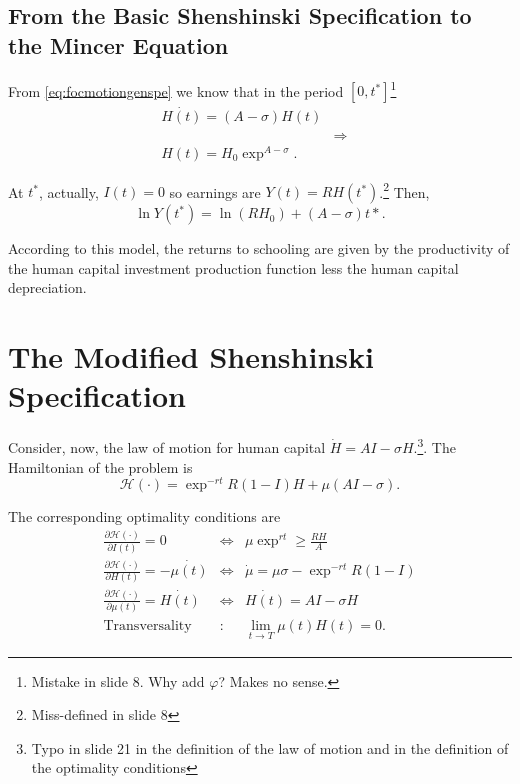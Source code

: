 \subsection{From the Basic Shenshinski Specification to the Mincer Equation}
From \eqref{eq:focmotiongenspe} we know that in the period $[0,t^*]$\footnote{Mistake in slide 8. Why add $\varphi$? Makes no sense.}
\begin{eqnarray}
\dot{H(t)} = (A - \sigma)H(t) \nonumber \\
&\Rightarrow& \nonumber \\ 
H(t) = H_{0} \exp^{A - \sigma}.
\end{eqnarray}

\noindent At $t^*$, actually, $I(t) = 0$ so earnings are $Y(t) = R H(t^*)$.\footnote{Miss-defined in slide 8} Then,
\begin{equation}
\ln Y(t^*) = \ln(RH_{0}) + (A - \sigma)t*.
\end{equation} 

\noindent According to this model, the returns to schooling are given by the productivity of the human capital investment production function less the human capital depreciation.  

\section{The Modified Shenshinski Specification}
Consider, now, the law of motion for human capital $\dot{H} = AI - \sigma H$.\footnote{Typo in slide 21 in the definition of the law of motion and in the definition of the optimality conditions}. The Hamiltonian of the problem is
\begin{equation}
\mathcal{H}(\cdot) = \exp^{-rt} R (1 - I)H + \mu (AI - \sigma).
\end{equation}

\noindent The corresponding optimality conditions are
\begin{eqnarray}
\frac{\partial \mathcal{H} (\cdot)}{\partial I(t)} = 0 &\Leftrightarrow& \mu \exp^{rt} \geq \frac{RH}{A} \label{eq:focinvestmentmodsehn} \\
\frac{\partial \mathcal{H} (\cdot)}{\partial H(t)} = - \dot{\mu(t)} &\Leftrightarrow& \dot{\mu} = \mu \sigma - \exp^{-rt} R (1 - I) \label{eq:focstockmodshen} \\ 
\frac{\partial \mathcal{H} (\cdot)}{\partial \mu(t)} = \dot{H(t)} &\Leftrightarrow& \dot{H(t)} = AI - \sigma H \label{eq:focmotionmodshen} \\
\text{Transversality} &:& \lim_{t \rightarrow T} \mu(t) H(t) = 0. \label{eq:foctransversalitymodshen}
\end{eqnarray}

